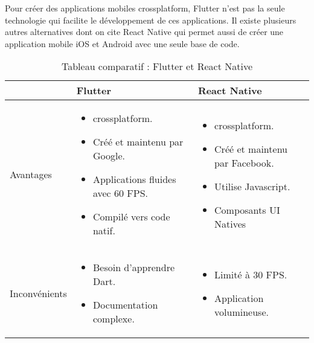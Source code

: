 Pour créer des applications mobiles crossplatform, Flutter n'est pas la seule technologie qui facilite le développement de ces applications. Il existe plusieurs autres alternatives dont on cite React Native qui permet aussi de créer une application mobile iOS et Android avec une seule base de code.
\begin{table}[H]
    \begin{center}
        \begin{tabularx}{\textwidth} {
                | >{\centering\arraybackslash}X
                | >{\centering\arraybackslash}X
                | >{\centering\arraybackslash}X |}
            \hline
                          & Flutter                                 & React Native \\
            \hline
            Avantages     & \begin{itemize}
                                \item crossplatform.
                                \item Créé et maintenu par Google.
                                \item Applications fluides avec 60 FPS.
                                \item Compilé vers code natif.
                            \end{itemize} & \begin{itemize}
                                                \item crossplatform.
                                                \item Créé et maintenu par Facebook.
                                                \item Utilise Javascript.
                                                \item Composants UI Natives
                                            \end{itemize}    \\
            \hline
            Inconvénients & \begin{itemize}
                                \item Besoin d'apprendre Dart.
                                \item Documentation complexe.
                            \end{itemize}          & \begin{itemize}
                                                         \item Limité à 30 FPS.
                                                         \item Application volumineuse.
                                                     \end{itemize} \\
            \hline
        \end{tabularx}
        \captionsetup{justification = centering}
        \caption{Tableau comparatif : Flutter et React Native}
        \label{compare_flutter_react_native}
    \end{center}
\end{table}
